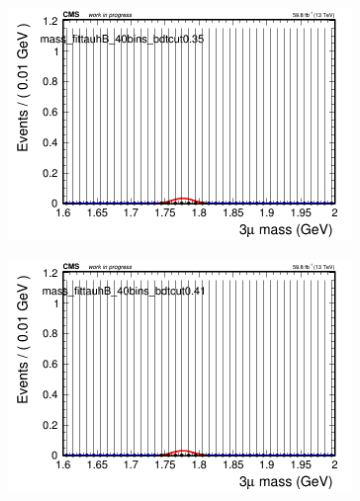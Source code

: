\begin{figure}[H]
\begin{subfigure}{0.2\textwidth}
        \caption{}
    \end{subfigure}
    \begin{subfigure}{0.2\textwidth}
        \includegraphics[width=\textwidth]{unfixed_exp/plots/tauhB/massfit_tauhB_40bins_bdtcut0.35.png}
        \caption{}
    \end{subfigure}
    \begin{subfigure}{0.2\textwidth}
        \includegraphics[width=\textwidth]{unfixed_exp/plots/tauhB/massfit_tauhB_40bins_bdtcut0.41.png}
        \caption{}
    \end{subfigure}
    \begin{subfigure}{0.2\textwidth}

\end{subfigure}
\end{figure}
